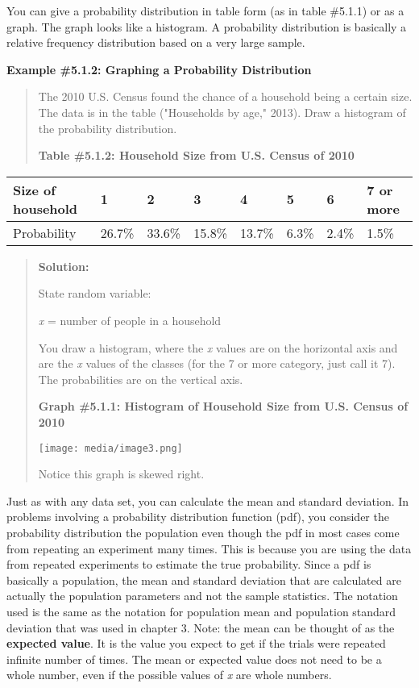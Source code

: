 \documentclass[]{book}
\begin{document}
You can give a probability distribution in table form (as in table \#5.1.1) or as a graph. The graph looks like a histogram. A probability distribution is basically a relative frequency distribution based on a very large sample.

\textbf{Example \#5.1.2: Graphing a Probability Distribution}

\begin{quote}
The 2010 U.S. Census found the chance of a household being a certain size. The data is in the table ("Households by age," 2013). Draw a histogram of the probability distribution.

\textbf{Table \#5.1.2: Household Size from U.S. Census of 2010}
\end{quote}

\begin{longtable}[]{@{}llllllll@{}}
\toprule
Size of household & 1 & 2 & 3 & 4 & 5 & 6 & 7 or more\tabularnewline
\midrule
\endhead
Probability & 26.7\% & 33.6\% & 15.8\% & 13.7\% & 6.3\% & 2.4\% & 1.5\%\tabularnewline
\bottomrule
\end{longtable}

\begin{quote}
\textbf{Solution:}

State random variable:

\emph{x} = number of people in a household

You draw a histogram, where the \emph{x} values are on the horizontal axis
and are the \emph{x} values of the classes (for the 7 or more category,
just call it 7). The probabilities are on the vertical axis.

\textbf{Graph \#5.1.1: Histogram of Household Size from U.S. Census of
2010}

\texttt{[image: media/image3.png]}

Notice this graph is skewed right.
\end{quote}

Just as with any data set, you can calculate the mean and standard
deviation. In problems involving a probability distribution function
(pdf), you consider the probability distribution the population even
though the pdf in most cases come from repeating an experiment many
times. This is because you are using the data from repeated experiments
to estimate the true probability. Since a pdf is basically a population,
the mean and standard deviation that are calculated are actually the
population parameters and not the sample statistics. The notation used
is the same as the notation for population mean and population standard
deviation that was used in chapter 3. Note: the mean can be thought of
as the \textbf{expected value}. It is the value you expect to get if the
trials were repeated infinite number of times. The mean or expected
value does not need to be a whole number, even if the possible values of
\emph{x} are whole numbers.
\end{document}
